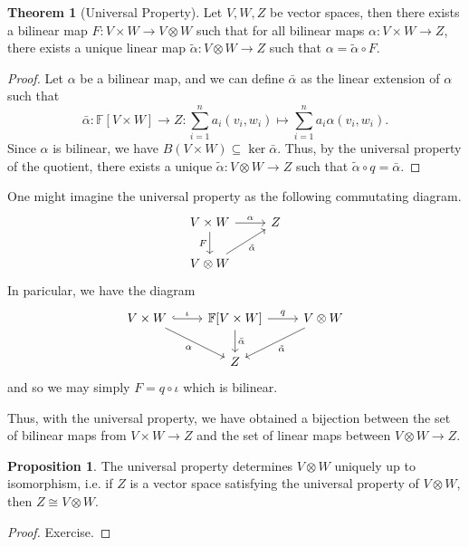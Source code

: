 \documentclass[]{article}
\theoremstyle{definition}
\newtheorem{theorem}{Theorem}
\theoremstyle{definition}
\newtheorem{proposition}{Proposition}[section]
\begin{document}
\begin{theorem}[Universal Property]
  Let \(V, W, Z\) be vector spaces, then there exists a bilinear map 
  \(F : V \times W \to V \otimes W\) such that for all bilinear maps 
  \(\alpha : V \times W \to Z\), there exists a unique linear map 
  \(\tilde \alpha : V \otimes W \to Z\) such that 
  \(\alpha = \tilde \alpha \circ F\).
\end{theorem}
\begin{proof}
  Let \(\alpha\) be a bilinear map, and we can define \(\bar \alpha\) as the 
  linear extension of \(\alpha\) such that 
  \[\bar \alpha : \mathbb{F}[V \times W] \to Z : 
  \sum_{i = 1}^n a_i (v_i, w_i) \mapsto \sum_{i = 1}^n a_i \alpha(v_i, w_i).\]
  Since \(\alpha\) is bilinear, we have \(B(V \times W) \subseteq \ker \bar \alpha\).
  Thus, by the universal property of the quotient, there exists a unique  
  \(\tilde \alpha : V \otimes W \to Z\) such that 
  \(\tilde \alpha \circ q = \bar \alpha\). 
\end{proof}

One might imagine the universal property as the following 
commutating diagram.
\[\begin{tikzcd}
  V \times W \arrow{r}{\alpha} \arrow[swap]{d}{F} & Z \\
  V \otimes W \arrow[swap]{ur}{\tilde \alpha}&
  \end{tikzcd}\]
In paricular, we have the diagram 
\[\begin{tikzcd}
  V \times W \arrow[hookrightarrow]{r}{\iota} \arrow[swap]{rd}{\alpha}
    & \mathbb{F}[V \times W] \arrow{r}{q} \arrow{d}{\bar \alpha} 
    & V \otimes W \arrow{ld}{\tilde \alpha}\\
  & Z &
\end{tikzcd}\]
and so we may simply \(F = q \circ \iota\) which is bilinear.

Thus, with the universal property, we have obtained a bijection between 
the set of bilinear maps from \(V \times W \to Z\) and the set of linear 
maps between \(V \otimes W \to Z\).

\begin{proposition}
  The universal property determines \(V \otimes W\) uniquely up to isomorphism, 
  i.e. if \(Z\) is a vector space satisfying the universal property of 
  \(V \otimes W\), then \(Z \cong V \otimes W\).
\end{proposition}
\begin{proof}
  Exercise.
\end{proof}
\end{document}
